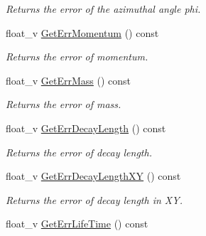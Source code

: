 \begin{DoxyCompactItemize}
\begin{DoxyCompactList}\small\item\em Returns the error of the azimuthal angle phi. \end{DoxyCompactList}\item 
float\+\_\+v \hyperlink{classKFParticleSIMD_a7bad6a41dbcbe77641c6d35743cf7f75}{Get\+Err\+Momentum} () const \hypertarget{classKFParticleSIMD_a7bad6a41dbcbe77641c6d35743cf7f75}{}\label{classKFParticleSIMD_a7bad6a41dbcbe77641c6d35743cf7f75}

\begin{DoxyCompactList}\small\item\em Returns the error of momentum. \end{DoxyCompactList}\item 
float\+\_\+v \hyperlink{classKFParticleSIMD_a73928ff05b0df6b1cb038d224eabe4cd}{Get\+Err\+Mass} () const \hypertarget{classKFParticleSIMD_a73928ff05b0df6b1cb038d224eabe4cd}{}\label{classKFParticleSIMD_a73928ff05b0df6b1cb038d224eabe4cd}

\begin{DoxyCompactList}\small\item\em Returns the error of mass. \end{DoxyCompactList}\item 
float\+\_\+v \hyperlink{classKFParticleSIMD_a355cd7aafcef1798409d9c1e253755a4}{Get\+Err\+Decay\+Length} () const \hypertarget{classKFParticleSIMD_a355cd7aafcef1798409d9c1e253755a4}{}\label{classKFParticleSIMD_a355cd7aafcef1798409d9c1e253755a4}

\begin{DoxyCompactList}\small\item\em Returns the error of decay length. \end{DoxyCompactList}\item 
float\+\_\+v \hyperlink{classKFParticleSIMD_a1cb105a0315a24031360346160f48c5f}{Get\+Err\+Decay\+Length\+XY} () const \hypertarget{classKFParticleSIMD_a1cb105a0315a24031360346160f48c5f}{}\label{classKFParticleSIMD_a1cb105a0315a24031360346160f48c5f}

\begin{DoxyCompactList}\small\item\em Returns the error of decay length in XY. \end{DoxyCompactList}\item 
float\+\_\+v \hyperlink{classKFParticleSIMD_a9756232862db86c5c45bdbe9744b49f1}{Get\+Err\+Life\+Time} () const \hypertarget{classKFParticleSIMD_a9756232862db86c5c45bdbe9744b49f1}{}\label{classKFParticleSIMD_a9756232862db86c5c45bdbe9744b49f1}


\end{DoxyCompactItemize}
